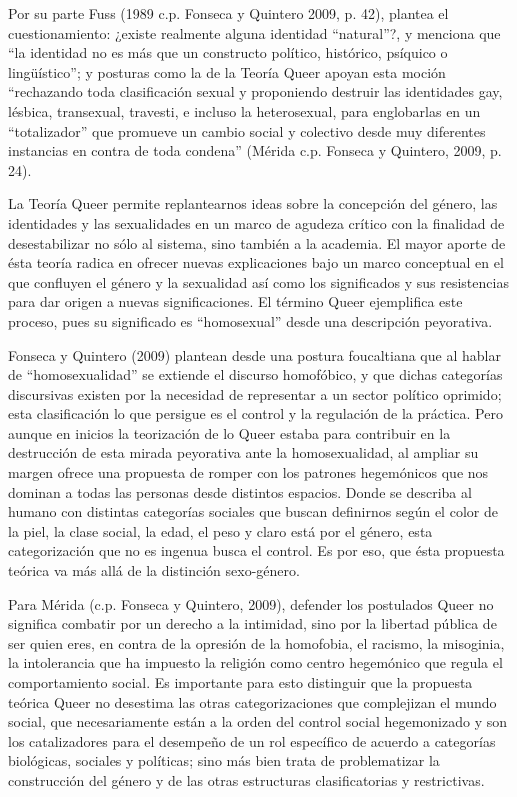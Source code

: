 Por su parte Fuss (1989 c.p. Fonseca y Quintero 2009, p. 42), plantea el
cuestionamiento: ¿existe realmente alguna identidad “natural”?, y menciona que
“la identidad no es más que un constructo político, histórico, psíquico o
lingüístico”;
y posturas como la de la Teoría Queer apoyan esta moción “rechazando toda
clasificación sexual y proponiendo destruir las identidades gay, lésbica,
transexual, travesti, e incluso la heterosexual, para englobarlas en un
“totalizador” que promueve un cambio social y colectivo desde muy diferentes
instancias en contra de toda condena” (Mérida c.p. Fonseca y Quintero, 2009,
p. 24).

La Teoría Queer permite replantearnos ideas sobre la concepción del género, las
identidades y las sexualidades en un marco de agudeza crítico con la finalidad
de desestabilizar no sólo al sistema, sino también a la academia.
El mayor aporte de ésta teoría radica en ofrecer nuevas explicaciones bajo un
marco conceptual en el que confluyen el género y la sexualidad así como los
significados y sus resistencias para dar origen a nuevas significaciones.
El término Queer ejemplifica este proceso, pues su significado es “homosexual”
desde una descripción peyorativa.

Fonseca y Quintero (2009) plantean desde una postura foucaltiana que al hablar
de “homosexualidad” se extiende el discurso homofóbico, y que dichas categorías
discursivas existen por la necesidad de representar a un sector político
oprimido;
esta clasificación lo que persigue es el control y la regulación de la práctica.
Pero aunque en inicios la teorización de lo Queer estaba para contribuir en la
destrucción de esta mirada peyorativa ante la homosexualidad, al ampliar su
margen ofrece una propuesta de romper con los patrones hegemónicos que nos
dominan a todas las personas desde distintos espacios.
Donde se describa al humano con distintas categorías sociales que buscan
definirnos según el color de la piel, la clase social, la edad, el peso y
claro está por el género, esta categorización que no es ingenua busca el
control.
Es por eso, que ésta propuesta teórica va más allá de la distinción sexo-género.

Para Mérida (c.p. Fonseca y Quintero, 2009), defender los postulados Queer no
significa combatir por un derecho a la intimidad, sino por la libertad pública
de ser quien eres, en contra de la opresión de la homofobia, el racismo, la
misoginia, la intolerancia que ha impuesto la religión como centro hegemónico
que regula el comportamiento social.
Es importante para esto distinguir que la propuesta teórica Queer no desestima
las otras categorizaciones que complejizan el mundo social, que necesariamente
están a la orden del control social hegemonizado y son los catalizadores para el
desempeño de un rol específico de acuerdo a categorías biológicas, sociales y
políticas;
sino más bien trata de problematizar la construcción del género y de
las otras estructuras clasificatorias y restrictivas.

